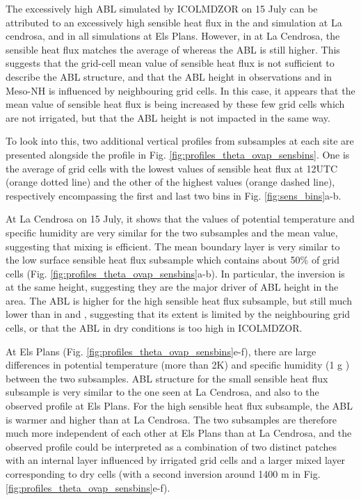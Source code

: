 The excessively high ABL simulated by ICOLMDZOR on 15 July can be attributed to an excessively high sensible heat flux in the \noirr and \irr simulation at La cendrosa, and in all simulations at Els Plans. However, in \irrboost at La Cendrosa, the sensible heat flux matches the average of \mesomean whereas the ABL is still higher. This suggests that the grid-cell mean value of sensible heat flux is not sufficient to describe the ABL structure, and that the ABL height in observations and in Meso-NH is influenced by neighbouring grid cells. In this case, it appears that the mean value of sensible heat flux is being increased by these few grid cells which are not irrigated, but that the ABL height is not impacted in the same way.

\hfill

To look into this, two additional vertical profiles from subsamples at each site are presented alongside the \mesomean profile in Fig. \ref{fig:profiles_theta_ovap_sensbins}. One is the average of grid cells with the lowest values of sensible heat flux at 12UTC (orange dotted line) and the other of the highest values (orange dashed line), respectively encompassing the first and last two bins in Fig. \ref{fig:sens_bins}a-b. 

At La Cendrosa on 15 July, it shows that the values of potential temperature and specific humidity are very similar for the two subsamples and the mean value, suggesting that mixing is efficient.
The mean boundary layer is very similar to the low surface sensible heat flux subsample which contains about 50\% of grid cells (Fig. \ref{fig:profiles_theta_ovap_sensbins}a-b). In particular, the inversion is at the same height, suggesting they are the major driver of ABL height in the area. The ABL is higher for the high sensible heat flux subsample, but still much lower than in \noirr and \irr, suggesting that its extent is limited by the neighbouring grid cells, or that the ABL in dry conditions is too high in ICOLMDZOR.

At Els Plans (Fig. \ref{fig:profiles_theta_ovap_sensbins}e-f), there are large differences in potential temperature (more than 2K) and specific humidity (1 g \perkg) between the two subsamples.
ABL structure for the small sensible heat flux subsample is very similar to the one seen at La Cendrosa, and also to the observed profile at Els Plans. For the high sensible heat flux subsample, the ABL is warmer and higher than at La Cendrosa. 
The two subsamples are therefore much more independent of each other at Els Plans than at La Cendrosa, and the observed profile could be interpreted as a combination of two distinct patches with an internal layer influenced by irrigated grid cells and a larger mixed layer corresponding to dry cells (with a second inversion around 1400 m in Fig. \ref{fig:profiles_theta_ovap_sensbins}e-f). 

